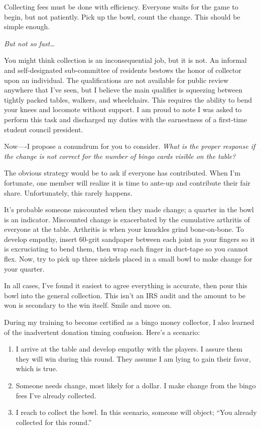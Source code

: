\documentclass[
  letterpaper,
  DIV=11,
  numbers=noendperiod]{scrreprt}
\begin{document}
Collecting fees must be done with efficiency. Everyone waits for the
game to begin, but not patiently. Pick up the bowl, count the change.
This should be simple enough.

\emph{But not so fast\ldots{}}

You might think collection is an inconsequential job, but it is not. An
informal and self-designated sub-committee of residents bestows the
honor of collector upon an individual. The qualifications are not
available for public review anywhere that I've seen, but I believe the
main qualifier is squeezing between tightly packed tables, walkers, and
wheelchairs. This requires the ability to bend your knees and locomote
without support. I am proud to note I was asked to perform this task and
discharged my duties with the earnestness of a first-time student
council president.

Now----I propose a conundrum for you to consider. \emph{What is the
proper response if the change is not correct for the number of bingo
cards visible on the table?}

The obvious strategy would be to ask if everyone has contributed. When
I'm fortunate, one member will realize it is time to ante-up and
contribute their fair share. Unfortunately, this rarely happens.

It's probable someone miscounted when they made change; a quarter in the
bowl is an indicator. Miscounted change is exacerbated by the cumulative
arthritis of everyone at the table. Arthritis is when your knuckles
grind bone-on-bone. To develop empathy, insert 60-grit sandpaper between
each joint in your fingers so it is excruciating to bend them, then wrap
each finger in duct-tape so you cannot flex. Now, try to pick up three
nickels placed in a small bowl to make change for your quarter.

In all cases, I've found it easiest to agree everything is accurate,
then pour this bowl into the general collection. This isn't an IRS audit
and the amount to be won is secondary to the win itself. Smile and move
on.

During my training to become certified as a bingo money collector, I
also learned of the inadvertent donation timing confusion. Here's a
scenario:

\begin{enumerate}
\def\labelenumi{\arabic{enumi}.}
\item
  I arrive at the table and develop empathy with the players. I assure
  them they will win during this round. They assume I am lying to gain
  their favor, which is true.
\item
  Someone needs change, most likely for a dollar. I make change from the
  bingo fees I've already collected.
\item
  I reach to collect the bowl. In this scenario, someone will object;
  ``You already collected for this round.''
\end{enumerate}
\end{document}
